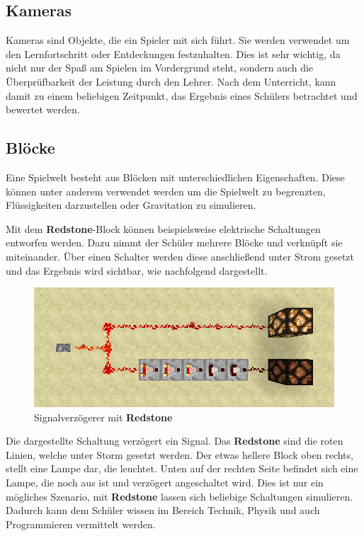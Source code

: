 \subsection{Kameras}

Kameras sind Objekte, die ein Spieler mit sich führt. Sie werden verwendet um den Lernfortschritt oder Entdeckungen festzuhalten. Dies ist sehr wichtig, da nicht nur der Spaß am Spielen im Vordergrund steht, sondern auch die Überprüfbarkeit der Leistung durch den Lehrer. Nach dem Unterricht, kann damit zu einem beliebigen Zeitpunkt, das Ergebnis eines Schülers betrachtet und bewertet werden.

\subsection{Blöcke}

Eine Spielwelt besteht aus Blöcken mit unterschiedlichen Eigenschaften. Diese können unter anderem verwendet werden um die Spielwelt zu begrenzten, Flüssigkeiten darzustellen oder Gravitation zu simulieren.

Mit dem \textbf{Redstone}-Block können beispielsweise elektrische Schaltungen entworfen werden. Dazu nimmt der Schüler mehrere Blöcke und verknüpft sie miteinander. Über einen Schalter werden diese anschließend unter Strom gesetzt und das Ergebnis wird sichtbar, wie nachfolgend dargestellt.

\begin{figure}[ht]
	\centering
	\includegraphics[width=\textwidth,height=\textheight,keepaspectratio]{images/RedstoneSignalverzoegerer.png}
	\caption{Signalverzögerer mit \textbf{Redstone} \cite{GamepediaMinecraft}}
	\label{redstoneSignalDelay}
\end{figure}

Die dargestellte Schaltung verzögert ein Signal. Das \textbf{Redstone} sind die roten Linien, welche unter Storm gesetzt werden. Der etwas hellere Block oben rechts, stellt eine Lampe dar, die leuchtet. Unten auf der rechten Seite befindet sich eine Lampe, die noch aus ist und verzögert angeschaltet wird.
Dies ist nur ein mögliches Szenario, mit \textbf{Redstone} lassen sich beliebige Schaltungen simulieren.
Dadurch kann dem Schüler wissen im Bereich Technik, Physik und auch Programmieren vermittelt werden.

